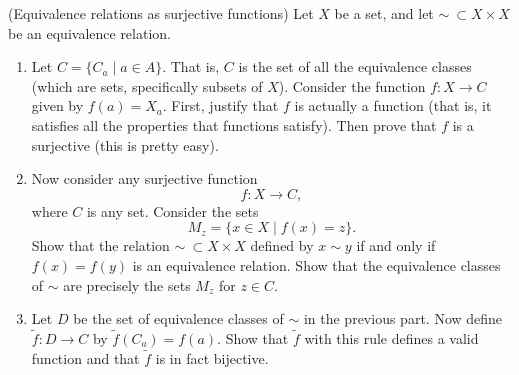 (Equivalence relations as surjective functions) Let $X$ be a set, and let $\sim~\subset X \times X$ be an equivalence relation.

\begin{enumerate}
    \item Let $C = \{C_a \mid a \in A\}$. That is, $C$ is the set of all the equivalence classes (which are sets, specifically subsets of $X$). Consider the function $f:X \to C$ given by $f(a) = X_a$. First, justify that $f$ is actually a function (that is, it satisfies all the properties that functions satisfy). Then prove that $f$ is a surjective (this is pretty easy).
    \item Now consider any surjective function
    \[f:X \to C,\] where $C$ is any set. Consider the sets 
    \[M_z = \{x \in X \mid f(x) = z\}.\]
    Show that the relation $\sim~\subset X \times X$ defined by $x \sim y$ if and only if $f(x) = f(y)$ is an equivalence relation. Show that the equivalence classes of $\sim$ are precisely the sets $M_z$ for $z \in C$.
    \item Let $D$ be the set of equivalence classes of $\sim$ in the previous part. Now define $\tilde{f}: D \to C$ by $\tilde{f}(C_a) = f(a)$.
    Show that $\tilde{f}$ with this rule defines a valid function and that $\tilde{f}$ is in fact bijective.
\end{enumerate}
